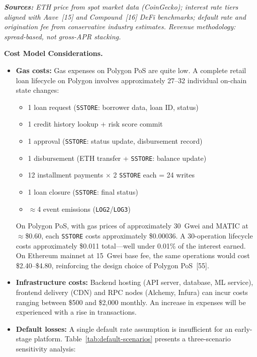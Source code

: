 \documentclass[12pt,a4paper]{report}
\begin{document}
\vspace{4pt}
\noindent\textit{\small\textbf{Sources:} ETH price from spot market data (CoinGecko); interest rate tiers aligned with Aave~[15] and Compound~[16] DeFi benchmarks; default rate and origination fee from conservative industry estimates. Revenue methodology: spread-based, not gross-APR stacking.}

\vspace{6pt}
\noindent\textbf{Cost Model Considerations.}

\begin{itemize}[noitemsep]
\item \textbf{Gas costs:} Gas expenses on Polygon PoS are quite low. A complete retail loan lifecycle on Polygon involves approximately 27--32 individual on-chain state changes:
\label{sec:gas-cost}
\begin{itemize}[noitemsep]
  \item 1 loan request (\texttt{SSTORE}: borrower data, loan ID, status)
  \item 1 credit history lookup + risk score commit
  \item 1 approval (\texttt{SSTORE}: status update, disbursement record)
  \item 1 disbursement (ETH transfer + \texttt{SSTORE}: balance update)
  \item 12 installment payments $\times$ 2 \texttt{SSTORE} each = 24 writes
  \item 1 loan closure (\texttt{SSTORE}: final status)
  \item $\approx$4 event emissions (\texttt{LOG2}/\texttt{LOG3})
\end{itemize}
On Polygon PoS, with gas prices of approximately 30~Gwei and MATIC at $\approx$\$0.60, each \texttt{SSTORE} costs approximately \$0.00036. A 30-operation lifecycle costs approximately \$0.011 total---well under 0.01\% of the interest earned. On Ethereum mainnet at 15~Gwei base fee, the same operations would cost \$2.40--\$4.80, reinforcing the design choice of Polygon PoS~[55].
\item \textbf{Infrastructure costs:} Backend hosting (API server, database, ML service), frontend delivery (CDN) and RPC nodes (Alchemy, Infura) can incur costs ranging between \$500 and \$2,000 monthly. An increase in expenses will be experienced with a rise in transactions.
\item \textbf{Default losses:} A single default rate assumption is insufficient for an early-stage platform. Table~\ref{tab:default-scenarios} presents a three-scenario sensitivity analysis:


\end{itemize}
\end{document}
